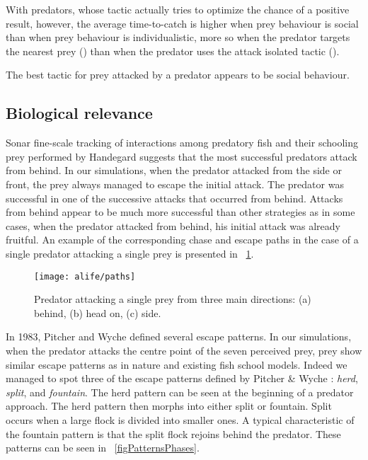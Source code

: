 With predators, whose tactic actually tries to optimize the chance of a positive result, however, the average time-to-catch is higher when prey behaviour is social than when prey behaviour is individualistic, more so when the predator targets the nearest prey () than when the predator uses the attack isolated tactic ().

The best tactic for prey attacked by a predator appears to be social behaviour.

\subsection{Biological relevance}

Sonar fine-scale tracking of interactions among predatory fish and their schooling prey performed by Handegard\etal \cite{handegard2012dynamics} suggests that the most successful predators attack from behind. In our simulations, when the predator attacked from the side or front, the prey always managed to escape the initial attack. The predator was successful in one of the successive attacks that occurred from behind. Attacks from behind appear to be much more successful than other strategies as in some cases, when the predator attacked from behind, his initial attack was already fruitful. An example of the corresponding chase and escape paths in the case of a single predator attacking a single prey is presented in \figurename~\ref{figPaths}.

\begin{figure}
	\texttt{[image: alife/paths]}
	\caption{Predator attacking a single prey from three main directions: (a) behind, (b) head on, (c) side.}
	\label{figPaths}
\end{figure}

In 1983, Pitcher and Wyche \cite{pitcher1983predator} defined several escape patterns. In our simulations, when the predator attacks the centre point of the seven perceived prey, prey show similar escape patterns as in nature and existing fish school models. Indeed we managed to spot three of the escape patterns defined by Pitcher \& Wyche \cite{pitcher1983predator}: \emph{herd}, \emph{split}, and \emph{fountain}. The herd pattern can be seen at the beginning of a predator approach. The herd pattern then morphs into either split or fountain. Split occurs when a large flock is divided into smaller ones. A typical characteristic of the fountain pattern is that the split flock rejoins behind the predator. These patterns can be seen in \figurename~\ref{figPatternsPhases}.

